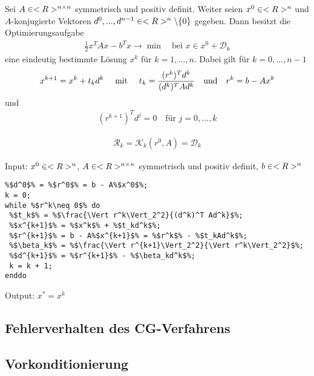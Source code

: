 \begin{lemma}
	Sei $A\in<R>^{n \times n}$ symmetrisch und positiv definit. Weiter seien $x^0\in<R>^n$ und $A$-konjugierte Vektoren $d^0,...,d^{n-1}\in<R>^n\backslash\{0\}$ gegeben. Dann besitzt die Optimierungsaufgabe
	\begin{align}
		\label{2_15}
		\frac{1}{2}x^TAx-b^Tx\to\min\quad\text{bei } x\in x^0+\mathcal{D}_k
	\end{align}
	eine eindeutig bestimmte Lösung $x^k$ für $k=1,...,n$. Dabei gilt für $k=0,...,n-1$
	\begin{align}
		\label{2_16}
		x^{k+1} = x^k + t_kd^k\quad\mit\quad t_k = \frac{(r^k)^Td^k}{(d^k)^TAd^k}\quad\text{und}\quad r^k=b-Ax^k
	\end{align}
	und
	\begin{align}
		\label{2_17}
		(r^{k+1})^Td^j = 0\quad\text{für } j=0,...,k
	\end{align}
\end{lemma}

\begin{align}
	\label{2_23}
	\mathcal{R}_k = \mathcal{K}_k(r^0,A)=\mathcal{D}_k
\end{align}

\begin{algorithm}[CG-Verfahren]
	Input: $x^0\in<R>^n$, $A\in<R>^{n \times n}$ symmetrisch und positiv definit, $b\in<R>^n$
	\begin{lstlisting}
%$d^0$% = %$r^0$% = b - A%$x^0$%;
k = 0;
while %$r^k\neq 0$% do
 %$t_k$% = %$\frac{\Vert r^k\Vert_2^2}{(d^k)^T Ad^k}$%;
 %$x^{k+1}$% = %$x^k$% + %$t_kd^k$%;
 %$r^{k+1}$% = b - A%$x^{k+1}$% = %$r^k$% - %$t_kAd^k$%;
 %$\beta_k$% = %$\frac{\Vert r^{k+1}\Vert_2^2}{\Vert r^k\Vert_2^2}$%;
 %$d^{k+1}$% = %$r^{k+1}$% - %$\beta_kd^k$%;
 k = k + 1;
enddo
	\end{lstlisting}
	Output: $x^\ast=x^k$
\end{algorithm}

\subsection{Fehlerverhalten des CG-Verfahrens}

\subsection{Vorkonditionierung}

